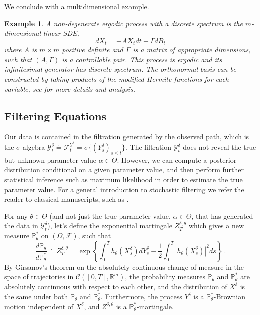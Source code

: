 \documentclass{article}
\newtheorem{example}{Example}[section]
\begin{document}
We conclude with a multidimensional example.
\begin{example}\label{Ex:MultiDOU} A non-degenerate ergodic process with a discrete spectrum is the $m$-dimensional linear SDE,
\[dX_t = -A X_tdt+\Gamma dB_t\]
where $A$ is $m\times m$ positive definite and $\Gamma$ is a matrix of appropriate dimensions, such that $(A,\Gamma)$ is a controllable pair. This process is ergodic and its infinitesimal generator has discrete spectrum. The orthonormal basis can be constructed by taking products of the modified Hermite functions for each variable, see \cite{LiberzonBrockett,linetskyBook} for more details and analysis.
\end{example}




\subsection{Filtering Equations}\label{S:FilteringReview}
Our data is contained in the filtration generated by the observed path, which is the $\sigma$-algebra $\mathcal Y_t^\delta \doteq\mathcal F_t^{Y^\delta} = \sigma \{(Y_s^\delta)_{s\leq t}\}$. The filtration $\mathcal Y_t^\delta$ does not reveal  the true but unknown parameter value $\alpha\in\Theta$. However, we can compute a posterior distribution conditional on a given parameter value, and then perform further statistical inference such as maximum likelihood in order to estimate the true parameter value. For a general introduction to stochastic filtering we refer the reader to classical manuscripts, such as \cite{bainCrisan,Kallianpur,Kushner,Rozovskii}.

For any $\theta\in\Theta$ (and not just the true parameter value, $\alpha\in\Theta$, that has generated the data in $\mathcal Y_t^\delta$), let's define the exponential martingale $Z_T^{\delta,\theta}$ which gives a new measure $\mathbb{P}_{\theta}^{*}$ on $(\Omega,\mathcal{F})$, such that
\begin{equation}
\frac{d\mathbb{P}_{\theta}}{d\mathbb{P}^{*}_{\theta}}\doteq Z_T^{\delta,\theta}=\exp\left\{ \int_{0}^{T}h_{\theta}(X^{\delta}_{s})dY^{\delta}_{s}-\frac{1}{2}\int_{0}^{T}\left|h_{\theta}(X^{\delta}_{s})\right|^{2}ds   \right\}\ .\label{Eq:LogLikelihoodPreLimit}
\end{equation}
By Girsanov's theorem on the absolutely continuous change of measure in the space of trajectories in $\mathcal{C}([0,T],\mathbb R^m)$, the probability measures $\mathbb{P}_{\theta}$ and $\mathbb{P}^{*}_{\theta}$ are absolutely continuous with respect to each other, and the distribution of $X^\delta$ is the same under both $\mathbb{P}_{\theta}$ and $\mathbb{P}_{\theta}^{*}$. Furthermore,  the process $Y^\delta$ is a $\mathbb{P}_{\theta}^*$-Brownian motion independent of $X^\delta$, and $Z^{\delta,\theta}$ is a $\mathbb P_\theta^*$-martingale.
\end{document}
